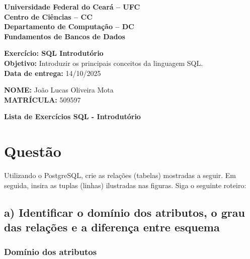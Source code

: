\documentclass[a4paper,12pt]{article}
\begin{document}
\begin{center}
    \textbf{Universidade Federal do Ceará – UFC}\\
    \textbf{Centro de Ciências – CC}\\
    \textbf{Departamento de Computação – DC}\\
    \textbf{Fundamentos de Bancos de Dados}
\end{center}
\vspace{0.5cm}

\noindent
\textbf{Exercício: SQL Introdutório}\\
\textbf{Objetivo:} Introduzir os principais conceitos da linguagem SQL.\\
\textbf{Data de entrega:} 14/10/2025

\vspace{0.7cm}

\noindent
\textbf{NOME:} João Lucas Oliveira Mota\\
\textbf{MATRÍCULA:} 509597

\vspace{1cm}

\begin{center}
    \Large\textbf{Lista de Exercícios SQL - Introdutório}
\end{center}

\vspace{0.5cm}

\section{ Questão}
Utilizando o PostgreSQL, crie as relações (tabelas) mostradas a seguir. Em seguida, insira as tuplas (linhas) ilustradas nas figuras. Siga o seguinte roteiro:
\subsection*{a) Identificar o domínio dos atributos, o grau das relações e a diferença entre esquema }
\subsubsection*{Domínio dos atributos}
\end{document}
